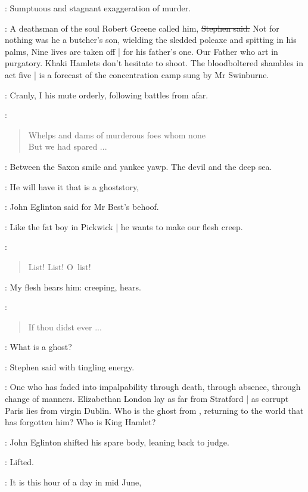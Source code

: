 \StephenInt:
Sumptuous and stagnant exaggeration of murder.

\Stephen:
A deathsman of the soul Robert Greene called him,
\sout{Stephen said.}
Not for nothing was he a butcher's son,
wielding the sledded poleaxe and spitting in his palms,
Nine lives are taken off |
for his father's one.
Our Father who art in purgatory.
Khaki Hamlets don't hesitate to shoot.
The bloodboltered shambles in act five |
is a forecast of the concentration camp sung by Mr Swinburne.

\StephenInt:
Cranly,
I his mute orderly,
following battles from afar.

\StephenInt:
\begin{verse}
    Whelps and dams of murderous foes whom none \\
    But we had spared ...
\end{verse}

\StephenInt:
Between the Saxon smile and yankee yawp.
The devil and the deep sea.%

\eglinton:
He will have it that  is a ghoststory,

:
John Eglinton said for Mr Best's behoof.

\eglinton:
Like the fat boy in Pickwick |
he wants to make our flesh creep.

\StephenInt:
\begin{verse}
    List! List! O~list!
\end{verse}

\StephenInt:
My flesh hears him:
creeping, hears.

\StephenInt:
\begin{verse}
    If thou didst ever ...
\end{verse}

\Stephen:
What is a ghost?

:
Stephen said with tingling energy.

\Stephen:
One who has faded into impalpability through death,
through absence,
through change of manners.
Elizabethan London lay as far from Stratford |
as corrupt Paris lies from virgin Dublin.
Who is the ghost from ,
returning to the world that has forgotten him?
Who is King Hamlet?

:
John Eglinton shifted his spare body,
leaning back to judge.

\StephenInt:
Lifted.

\Stephen:
It is this hour of a day in mid June,


